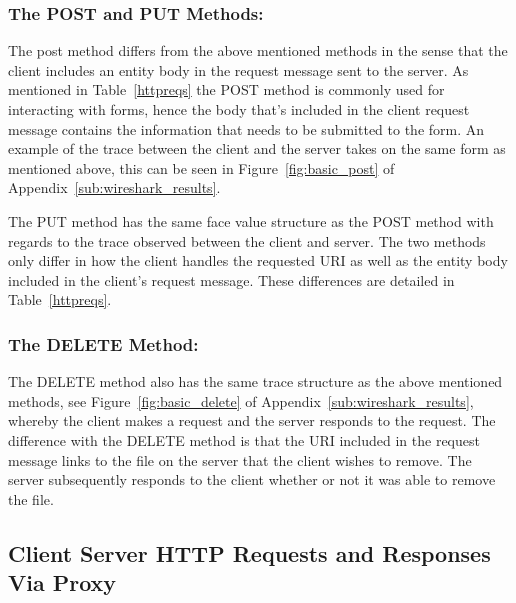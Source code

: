 \documentclass[10pt,twocolumn]{witseiepaper}
\begin{document}
		
		\subsubsection*{The POST and PUT Methods:} The post method differs from the above mentioned methods in the sense that the client includes an entity body in the request message sent to the server. As mentioned in Table~\ref{httpreqs} the POST method is commonly used for interacting with forms, hence the body that's included in the client request message contains the information that needs to be submitted to the form. An example of the trace between the client and the server takes on the same form as mentioned above, this can be seen in Figure~\ref{fig:basic_post} of Appendix~\ref{sub:wireshark_results}.
		
		 The PUT method has the same face value structure as the POST method with regards to the trace observed between the client and server. The two methods only differ in how the client handles the requested URI as well as the entity body included in the client's request message. These differences are detailed in Table~\ref{httpreqs}.
		 
		 \subsubsection*{The DELETE Method:} The DELETE method also has the same trace structure as the above mentioned methods, see Figure~\ref{fig:basic_delete} of Appendix~\ref{sub:wireshark_results}, whereby the client makes a request and the server responds to the request. The difference with the DELETE method is that the URI included in the request message links to the file on the server that the client wishes to remove. The server subsequently responds to the client whether or not it was able to remove the file. 
	 
	 \subsection{Client Server HTTP Requests and Responses Via Proxy}	
	 
\end{document}

